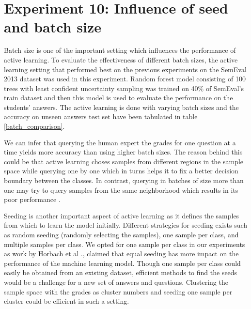 \clearpage

\section{Experiment 10: Influence of seed and batch size}

Batch size is one of the important setting which influences the performance of active learning. To evaluate the effectiveness of different batch sizes, the active learning setting that performed best on the previous experiments on the SemEval 2013 dataset was used in this experiment. Random forest model consisting of 100 trees with least confident uncertainty sampling was trained on 40\% of SemEval's train dataset and then this model is used to evaluate the performance on the students' answers. The active learning is done with varying batch sizes and the accuracy on unseen answers test set have been tabulated in table \ref{batch_comparison}.

\begin{table}[!htb]
	\centering
		\caption{Accuracy for different batch sizes.}
		\label{batch_comparison}
	\end{table}
	
We can infer that querying the human expert the grades for one question at a time yields more accuracy than using higher batch sizes. The reason behind this could be that active learning choses samples from different regions in the sample space while querying one by one which in turns helps it to fix a better decision boundary between the classes. In contrast, querying in batches of size more than one may try to query samples from the same neighborhood which results in its poor performance \cite{Horbach2016}. 

Seeding is another important aspect of active learning as it defines the samples from which to learn the model initially. Different strategies for seeding exists such as random seeding (randomly selecting the samples), one sample per class, and multiple samples per class. We opted for one sample per class in our experiments as work by Horbach et al \cite{Horbach2016}., claimed that equal seeding has more impact on the performance of the machine learning model. Though one sample per class could easily be obtained from an existing dataset, efficient methods to find the seeds would be a challenge for a new set of answers and questions. Clustering the sample space with the grades as cluster numbers and seeding one sample per cluster could be efficient in such a setting.  

